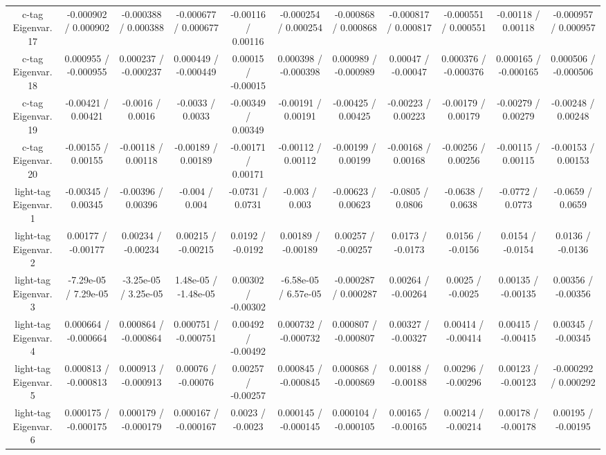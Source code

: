 \begin{table}[htbp]
\begin{center}
\begin{tabular}{|c|c|c|c|c|c|c|c|c|c|c|}
  c-tag Eigenvar. 17 & -0.000902 / 0.000902 & -0.000388 / 0.000388 & -0.000677 / 0.000677 & -0.00116 / 0.00116 & -0.000254 / 0.000254 & -0.000868 / 0.000868 & -0.000817 / 0.000817 & -0.000551 / 0.000551 & -0.00118 / 0.00118 & -0.000957 / 0.000957 \\ 
  c-tag Eigenvar. 18 & 0.000955 / -0.000955 & 0.000237 / -0.000237 & 0.000449 / -0.000449 & 0.00015 / -0.00015 & 0.000398 / -0.000398 & 0.000989 / -0.000989 & 0.00047 / -0.00047 & 0.000376 / -0.000376 & 0.000165 / -0.000165 & 0.000506 / -0.000506 \\ 
  c-tag Eigenvar. 19 & -0.00421 / 0.00421 & -0.0016 / 0.0016 & -0.0033 / 0.0033 & -0.00349 / 0.00349 & -0.00191 / 0.00191 & -0.00425 / 0.00425 & -0.00223 / 0.00223 & -0.00179 / 0.00179 & -0.00279 / 0.00279 & -0.00248 / 0.00248 \\ 
  c-tag Eigenvar. 20 & -0.00155 / 0.00155 & -0.00118 / 0.00118 & -0.00189 / 0.00189 & -0.00171 / 0.00171 & -0.00112 / 0.00112 & -0.00199 / 0.00199 & -0.00168 / 0.00168 & -0.00256 / 0.00256 & -0.00115 / 0.00115 & -0.00153 / 0.00153 \\ 
  light-tag Eigenvar. 1 & -0.00345 / 0.00345 & -0.00396 / 0.00396 & -0.004 / 0.004 & -0.0731 / 0.0731 & -0.003 / 0.003 & -0.00623 / 0.00623 & -0.0805 / 0.0806 & -0.0638 / 0.0638 & -0.0772 / 0.0773 & -0.0659 / 0.0659 \\ 
  light-tag Eigenvar. 2 & 0.00177 / -0.00177 & 0.00234 / -0.00234 & 0.00215 / -0.00215 & 0.0192 / -0.0192 & 0.00189 / -0.00189 & 0.00257 / -0.00257 & 0.0173 / -0.0173 & 0.0156 / -0.0156 & 0.0154 / -0.0154 & 0.0136 / -0.0136 \\ 
  light-tag Eigenvar. 3 & -7.29e-05 / 7.29e-05 & -3.25e-05 / 3.25e-05 & 1.48e-05 / -1.48e-05 & 0.00302 / -0.00302 & -6.58e-05 / 6.57e-05 & -0.000287 / 0.000287 & 0.00264 / -0.00264 & 0.0025 / -0.0025 & 0.00135 / -0.00135 & 0.00356 / -0.00356 \\ 
  light-tag Eigenvar. 4 & 0.000664 / -0.000664 & 0.000864 / -0.000864 & 0.000751 / -0.000751 & 0.00492 / -0.00492 & 0.000732 / -0.000732 & 0.000807 / -0.000807 & 0.00327 / -0.00327 & 0.00414 / -0.00414 & 0.00415 / -0.00415 & 0.00345 / -0.00345 \\ 
  light-tag Eigenvar. 5 & 0.000813 / -0.000813 & 0.000913 / -0.000913 & 0.00076 / -0.00076 & 0.00257 / -0.00257 & 0.000845 / -0.000845 & 0.000868 / -0.000869 & 0.00188 / -0.00188 & 0.00296 / -0.00296 & 0.00123 / -0.00123 & -0.000292 / 0.000292 \\ 
  light-tag Eigenvar. 6 & 0.000175 / -0.000175 & 0.000179 / -0.000179 & 0.000167 / -0.000167 & 0.0023 / -0.0023 & 0.000145 / -0.000145 & 0.000104 / -0.000105 & 0.00165 / -0.00165 & 0.00214 / -0.00214 & 0.00178 / -0.00178 & 0.00195 / -0.00195 \\ 

\end{tabular}
\end{center}
\end{table}
